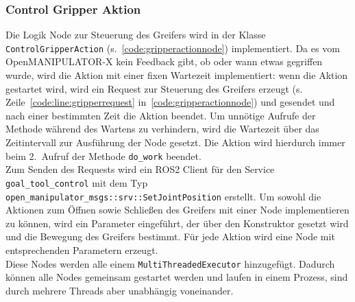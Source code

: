\subsubsection{Control Gripper Aktion}
Die Logik Node zur Steuerung des Greifers wird in der Klasse \verb|ControlGripperAction| (s.~\ref{code:gripperactionnode}) implementiert.
Da es vom OpenMANIPULATOR-X kein Feedback gibt, ob oder wann etwas gegriffen wurde, wird die Aktion mit einer fixen Wartezeit implementiert: wenn die Aktion gestartet wird, wird ein Request zur Steuerung des Greifers erzeugt (s. Zeile~\ref{code:line:gripperrequest} in~\ref{code:gripperactionnode}) und gesendet und nach einer bestimmten Zeit die Aktion beendet.
Um unnötige Aufrufe der Methode während des Wartens zu verhindern, wird die Wartezeit über das Zeitintervall zur Ausführung der Node gesetzt.
Die Aktion wird hierdurch immer beim 2.\ Aufruf der Methode \verb|do_work| beendet.\\
Zum Senden des Requests wird ein \ac{ROS2} Client für den Service \verb|goal_tool_control| mit dem Typ \verb|open_manipulator_msgs::srv::SetJointPosition| erstellt. 
Um sowohl die Aktionen zum Öffnen sowie Schließen des Greifers mit einer Node implementieren zu können, wird ein Parameter eingeführt, der über den Konstruktor gesetzt wird und die Bewegung des Greifers bestimmt.
Für jede Aktion wird eine Node mit entsprechenden Parametern erzeugt.\\

Diese Nodes werden alle einem \verb|MultiThreadedExecutor| hinzugefügt. Dadurch können alle Nodes gemeinsam gestartet werden und laufen in einem Prozess, sind durch mehrere Threads aber unabhängig voneinander.

